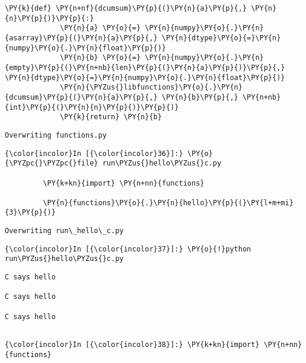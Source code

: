 \begin{Verbatim}[commandchars=\\\{\}]
         \PY{k}{def} \PY{n+nf}{dcumsum}\PY{p}{(}\PY{n}{a}\PY{p}{,} \PY{n}{n}\PY{p}{)}\PY{p}{:}
             \PY{n}{a} \PY{o}{=} \PY{n}{numpy}\PY{o}{.}\PY{n}{asarray}\PY{p}{(}\PY{n}{a}\PY{p}{,} \PY{n}{dtype}\PY{o}{=}\PY{n}{numpy}\PY{o}{.}\PY{n}{float}\PY{p}{)}
             \PY{n}{b} \PY{o}{=} \PY{n}{numpy}\PY{o}{.}\PY{n}{empty}\PY{p}{(}\PY{n+nb}{len}\PY{p}{(}\PY{n}{a}\PY{p}{)}\PY{p}{,} \PY{n}{dtype}\PY{o}{=}\PY{n}{numpy}\PY{o}{.}\PY{n}{float}\PY{p}{)}
             \PY{n}{\PYZus{}libfunctions}\PY{o}{.}\PY{n}{dcumsum}\PY{p}{(}\PY{n}{a}\PY{p}{,} \PY{n}{b}\PY{p}{,} \PY{n+nb}{int}\PY{p}{(}\PY{n}{n}\PY{p}{)}\PY{p}{)}
             \PY{k}{return} \PY{n}{b}
\end{Verbatim}

    \begin{Verbatim}[commandchars=\\\{\}]
Overwriting functions.py

    \end{Verbatim}

    \begin{Verbatim}[commandchars=\\\{\}]
{\color{incolor}In [{\color{incolor}36}]:} \PY{o}{\PYZpc{}\PYZpc{}file} run\PYZus{}hello\PYZus{}c.py
         
         \PY{k+kn}{import} \PY{n+nn}{functions}
         
         \PY{n}{functions}\PY{o}{.}\PY{n}{hello}\PY{p}{(}\PY{l+m+mi}{3}\PY{p}{)}
\end{Verbatim}

    \begin{Verbatim}[commandchars=\\\{\}]
Overwriting run\_hello\_c.py

    \end{Verbatim}

    \begin{Verbatim}[commandchars=\\\{\}]
{\color{incolor}In [{\color{incolor}37}]:} \PY{o}{!}python run\PYZus{}hello\PYZus{}c.py
\end{Verbatim}

    \begin{Verbatim}[commandchars=\\\{\}]
C says hello

C says hello

C says hello


    \end{Verbatim}

    \begin{Verbatim}[commandchars=\\\{\}]
{\color{incolor}In [{\color{incolor}38}]:} \PY{k+kn}{import} \PY{n+nn}{functions}
\end{Verbatim}



